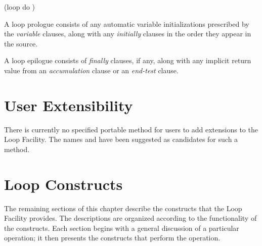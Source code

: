 \begin{lisp}
(loop do )
\end{lisp}

  A loop prologue consists of any automatic variable initializations prescribed 
  by the {\it variable\/} clauses, along with any {\it initially\/} clauses
  in the order they appear in the source.

  A loop epilogue consists of {\it finally\/} clauses, if any, along
  with any implicit return value from an {\it accumulation\/} clause or
  an {\it end-test\/} clause.


  \section{User Extensibility}

  There is currently no specified portable method for users to add
  extensions to the Loop Facility.  The names  and
   have been suggested as candidates for such a method.



\section{Loop Constructs}

The remaining sections of this chapter describe the constructs that the Loop Facility
provides.  The descriptions are organized according to the functionality
of the constructs.  Each section begins with a general discussion of
a particular operation; it then presents the constructs that perform the 
operation.

